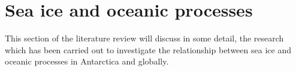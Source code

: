 \documentclass[../main.tex]{subfiles}
\begin{document}
\section{Sea ice and oceanic processes}
This section of the literature review will discuss in some detail, the research which has been carried out to investigate the relationship between sea ice and oceanic processes in Antarctica and globally.
\end{document}
